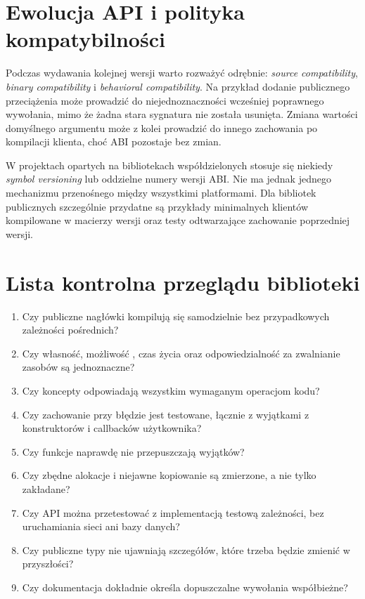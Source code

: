 \section{Ewolucja API i polityka kompatybilności}

Podczas wydawania kolejnej wersji warto rozważyć odrębnie:
\emph{source compatibility}, \emph{binary compatibility} i
\emph{behavioral compatibility}. Na przykład dodanie publicznego
przeciążenia może prowadzić do niejednoznaczności wcześniej
poprawnego wywołania, mimo że żadna stara sygnatura nie została
usunięta. Zmiana wartości domyślnego argumentu może z kolei
prowadzić do innego zachowania po kompilacji klienta, choć ABI
pozostaje bez zmian.

W projektach opartych na bibliotekach współdzielonych stosuje się
niekiedy \emph{symbol versioning} lub oddzielne numery wersji ABI.
Nie ma jednak jednego mechanizmu przenośnego między wszystkimi
platformami. Dla bibliotek publicznych szczególnie przydatne są
przykłady minimalnych klientów kompilowane w macierzy wersji oraz
testy odtwarzające zachowanie poprzedniej wersji.

\section{Lista kontrolna przeglądu biblioteki}

\begin{enumerate}
\item Czy publiczne nagłówki kompilują się samodzielnie bez przypadkowych
zależności pośrednich?
\item Czy własność, możliwość , czas życia oraz
odpowiedzialność za zwalnianie zasobów są jednoznaczne?
\item Czy koncepty odpowiadają wszystkim wymaganym operacjom kodu?
\item Czy zachowanie przy błędzie jest testowane, łącznie z wyjątkami
z konstruktorów i callbacków użytkownika?
\item Czy funkcje  naprawdę nie przepuszczają wyjątków?
\item Czy zbędne alokacje i niejawne kopiowanie są zmierzone, a nie
tylko zakładane?
\item Czy API można przetestować z implementacją testową zależności,
bez uruchamiania sieci ani bazy danych?
\item Czy publiczne typy nie ujawniają szczegółów, które trzeba
będzie zmienić w przyszłości?
\item Czy dokumentacja dokładnie określa dopuszczalne wywołania
współbieżne?
\end{enumerate}


